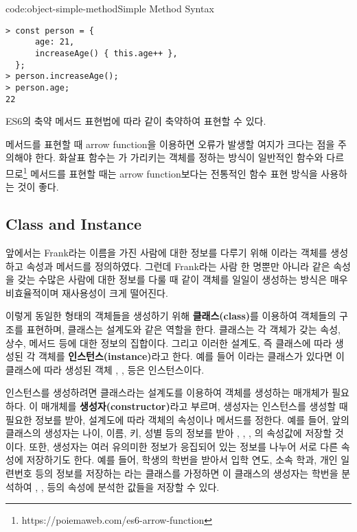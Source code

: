 \begin{codeenv}{code:object-simple-method}{Simple Method Syntax}\begin{verbatim}
> const person = {
      age: 21,
      increaseAge() { this.age++ },
  };
> person.increaseAge();
> person.age;
22
\end{verbatim}
\end{codeenv}

ES6의 축약 메서드 표현법에 따라 \와 같이 축약하여 표현할 수 있다.

메서드를 표현할 때 arrow function을 이용하면 오류가 발생할 여지가 크다는 점을 주의해야 한다. 화살표 함수는 가 가리키는 객체를 정하는 방식이 일반적인 함수와 다르므로\footnote{https://poiemaweb.com/es6-arrow-function} 메서드를 표현할 때는 arrow function보다는 전통적인 함수 표현 방식을 사용하는 것이 좋다.

\subsection*{Class and Instance}

앞에서는 Frank라는 이름을 가진 사람에 대한 정보를 다루기 위해 이라는 객체를 생성하고 속성과 메서드를 정의하였다. 그런데 Frank라는 사람 한 명뿐만 아니라 같은 속성을 갖는 수많은 사람에 대한 정보를 다룰 때 \와 같이 객체를 일일이 생성하는 방식은 매우 비효율적이며 재사용성이 크게 떨어진다.

이렇게 동일한 형태의 객체들을 생성하기 위해 \textbf{클래스(class)}를 이용하여 객체들의 구조를 표현하며, 클래스는 설계도와 같은 역할을 한다. 클래스는 각 객체가 갖는 속성, 상수, 메서드 등에 대한 정보의 집합이다. 그리고 이러한 설계도, 즉 클래스에 따라 생성된 각 객체를 \textbf{인스턴스(instance)}라고 한다. 예를 들어 이라는 클래스가 있다면 이 클래스에 따라 생성된 객체 , ,  등은 인스턴스이다.

인스턴스를 생성하려면 클래스라는 설계도를 이용하여 객체를 생성하는 매개체가 필요하다. 이 매개체를 \textbf{생성자(constructor)}라고 부르며, 생성자는 인스턴스를 생성할 때 필요한 정보를 받아, 설계도에 따라 객체의 속성이나 메서드를 정한다. 예를 들어, 앞의  클래스의 생성자는 나이, 이름, 키, 성별 등의 정보를 받아 , , , 의 속성값에 저장할 것이다. 또한, 생성자는 여러 유의미한 정보가 응집되어 있는 정보를 나누어 서로 다른 속성에 저장하기도 한다. 예를 들어, 학생의 학번을 받아서 입학 연도, 소속 학과, 개인 일련번호 등의 정보를 저장하는 라는 클래스를 가정하면 이 클래스의 생성자는 학번을 분석하여 , ,  등의 속성에 분석한 값들을 저장할 수 있다.

